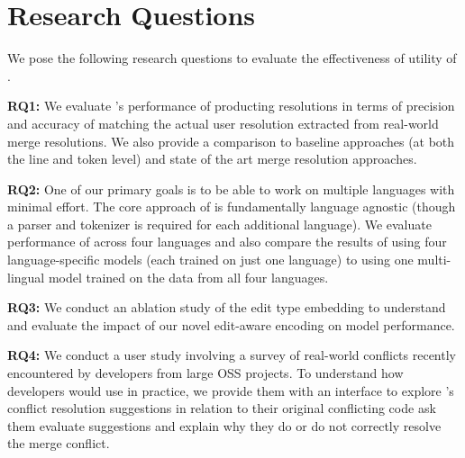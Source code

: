 \section{Research Questions}

We pose the following research questions to evaluate the effectiveness of utility of \thistool{}.


\noindent \textbf{RQ\scriptsize{1}: }\textbf{\rqOne}
We evaluate \thistool{}'s performance of producting resolutions in terms of precision and accuracy of matching the actual user resolution extracted from real-world merge resolutions. We also provide a comparison \thistool{} to baseline approaches (at both the line and token level) and state of the art merge resolution approaches.

\noindent \textbf{RQ\scriptsize{2}: }\textbf{\rqTwo}
One of our primary goals is to be able to work on multiple languages with minimal effort.  
The core approach of \thistool{} is fundamentally language agnostic (though a parser and tokenizer is required for each additional language).  
We evaluate performance of \thistool{} across four languages and also compare the results of using four language-specific models (each trained on just one language) to using one multi-lingual model trained on the data from all four languages.

\noindent \textbf{RQ\scriptsize{3}: }\textbf{\rqThree}
We conduct an ablation study of the edit type embedding to understand and evaluate the impact of our novel edit-aware encoding on model performance.

\noindent \textbf{RQ\scriptsize{4}: }\textbf{\rqFour}
We conduct a user study involving a survey of real-world conflicts recently encountered by developers from large OSS projects. To understand how developers would use \thistool{} in practice, we provide them with an interface to explore \thistool{}'s conflict resolution suggestions in relation to their original conflicting code ask them evaluate suggestions and explain why they do or do not correctly resolve the merge conflict. 
